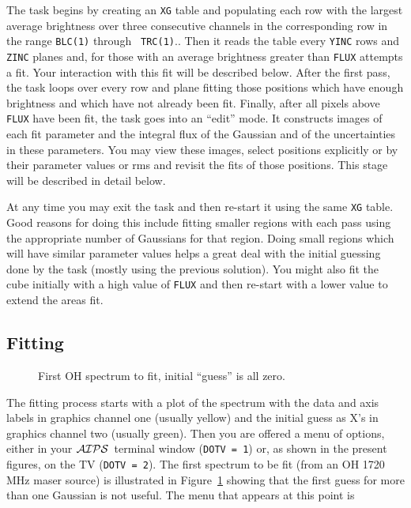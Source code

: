 \documentclass[twoside]{article}
\newcommand{\Hi}[1]{\textcolor{hicol}{#1}}
\newcommand{\AIPS}{{$\cal AIPS\/$}}
\newcommand{\putfig}[1]{\texttt{[image: \#1.eps]}}
\begin{document}
The task begins by creating an {\tt XG} table and populating each row
with the largest average brightness over three consecutive channels in
the corresponding row \Hi{in the range {\tt BLC(1)} through {\tt
TRC(1)}\@.}.  Then it reads the table every {\tt YINC} rows and {\tt
ZINC} planes and, for those with an average brightness greater than
{\tt FLUX} attempts a fit.  Your interaction with this fit will be
described below.  After the first pass, the task loops over every row
and plane fitting those positions which have enough brightness and
which have not already been fit.  Finally, after all pixels above {\tt
  FLUX} have been fit, the task goes into an ``edit'' mode.  It
constructs images of each fit parameter and the integral flux of the
Gaussian and of the uncertainties in these parameters.  You may view
these images, select positions explicitly or by their parameter values
or rms and revisit the fits of those positions.  This stage will be
described in detail below.

At any time you may exit the task and then re-start it using the
same {\tt XG} table.  Good reasons for doing this include fitting
smaller regions with each pass using the appropriate number of
Gaussians for that region.  Doing small regions which will have
similar parameter values helps a great deal with the initial guessing
done by the task (mostly using the previous solution).  You might also
fit the cube initially with a high value of {\tt FLUX} and then
re-start with a lower value to extend the areas fit.

\subsection{Fitting}

\begin{figure}
\begin{center}
\resizebox{6.0in}{!}{\putfig{XGAUS.init}}
\caption{First OH spectrum to fit, initial ``guess'' is all zero.}
\label{fig:XGAUS.init}
\end{center}
\end{figure}

The fitting process starts with a plot of the spectrum with the data
and axis labels in graphics channel one (usually yellow) and the
initial guess as X's in graphics channel two (usually green).  Then
you are offered a menu of options, either in your \AIPS\ terminal
window ({\tt DOTV = 1}) or, as shown in the present figures, on the TV
({\tt DOTV = 2}).  The first spectrum to be fit (from an OH 1720 MHz
maser source) is illustrated in Figure~\ref{fig:XGAUS.init} showing
that the first guess for more than one Gaussian is not useful.  The
menu that appears at this point is\\
\end{document}
